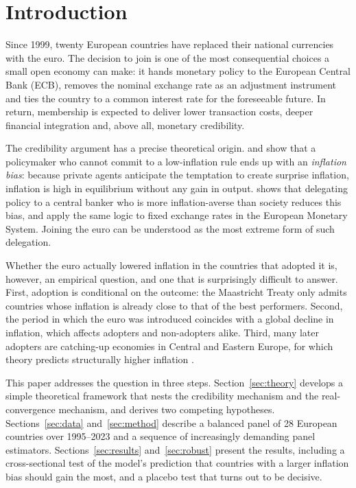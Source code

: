 \documentclass[11pt,a4paper]{article}
\numberwithin{equation}{section}
\theoremstyle{definition}
\theoremstyle{remark}
\begin{document}
\tableofcontents
\listoftables
\listoffigures
\clearpage

\section{Introduction}

Since 1999, twenty European countries have replaced their national currencies with the euro. The decision to join is one of the most consequential choices a small open economy can make: it hands monetary policy to the European Central Bank (ECB), removes the nominal exchange rate as an adjustment instrument and ties the country to a common interest rate for the foreseeable future. In return, membership is expected to deliver lower transaction costs, deeper financial integration and, above all, monetary credibility.

The credibility argument has a precise theoretical origin. \citet{kydland1977} and \citet{barro1983jpe} show that a policymaker who cannot commit to a low-inflation rule ends up with an \emph{inflation bias}: because private agents anticipate the temptation to create surprise inflation, inflation is high in equilibrium without any gain in output. \citet{rogoff1985} shows that delegating policy to a central banker who is more inflation-averse than society reduces this bias, and \citet{giavazzi1988} apply the same logic to fixed exchange rates in the European Monetary System. Joining the euro can be understood as the most extreme form of such delegation.

Whether the euro actually lowered inflation in the countries that adopted it is, however, an empirical question, and one that is surprisingly difficult to answer. First, adoption is conditional on the outcome: the Maastricht Treaty only admits countries whose inflation is already close to that of the best performers. Second, the period in which the euro was introduced coincides with a global decline in inflation, which affects adopters and non-adopters alike. Third, many later adopters are catching-up economies in Central and Eastern Europe, for which theory predicts structurally higher inflation \citep{balassa1964,samuelson1964}.

This paper addresses the question in three steps. Section~\ref{sec:theory} develops a simple theoretical framework that nests the credibility mechanism and the real-convergence mechanism, and derives two competing hypotheses. Sections~\ref{sec:data} and~\ref{sec:method} describe a balanced panel of 28 European countries over 1995--2023 and a sequence of increasingly demanding panel estimators. Sections~\ref{sec:results} and~\ref{sec:robust} present the results, including a cross-sectional test of the model's prediction that countries with a larger inflation bias should gain the most, and a placebo test that turns out to be decisive.
\end{document}
